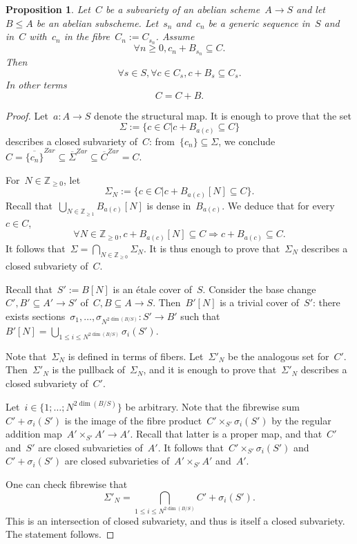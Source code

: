 \documentclass[12pt]{amsart}
\newtheorem{proposition}[theorem]{Proposition}
\newcommand{\Z}{{\mathbb Z}}
\newcommand{\ol}{\overline}
\begin{document}
\begin{proposition}\label{prop:truc} Let~$C$ be a subvariety of an abelian scheme~$A\to S$ and let~$B\leq A$ be an abelian subscheme. Let~$s_n$ and~$c_n$ be a generic sequence in~$S$ and in~$C$ with~$c_n$ in the fibre~$C_n:=C_{s_n}$. Assume 
\[
\forall n\geq 0, c_n+B_{s_n}\subseteq C.
\]
Then
\[
\forall s\in S, \forall c\in C_s, c+B_s\subseteq C_s.
\]
In other terms
\[
C=C+B.
\]
\end{proposition}
\begin{proof}
Let~$a:A\to S$ denote the structural map. It is enough to prove that the set
\[
\Sigma:=\{c\in C| c+B_{a(c)}\subseteq C\}
\]
describes a closed subvariety of~$C$: from~$\{c_n\}\subseteq \Sigma$, we conclude~$C=\ol{\{c_n\}}^{Zar}\subseteq \ol{\Sigma}^{Zar}\subseteq \ol{C}^{Zar}=C$.

For~$N\in \Z_{\geq0}$, let
\[
\Sigma_N:=\{c\in C| c+B_{a(c)}[N]\subseteq C\}.
\]
Recall that~$\bigcup_{N\in\Z_{\geq1}}B_{a(c)}[N]$ is dense in~$B_{a(c)}$. We deduce that for every~$c\in C$,
\[
\forall N\in\Z_{\geq0}, c+B_{a(c)}[N]\subseteq C\Rightarrow c+B_{a(c)}\subseteq C.
\]
It follows that~$\Sigma=\bigcap_{N\in\Z_{\geq0}} \Sigma_N$. It is thus enough to prove that~$\Sigma_N$ describes a closed subvariety of~$C$.


Recall that~$S':=B[N]$ is an étale cover of~$S$. Consider the base change~$C',B'\subseteq A'\to S'$ of~$C,B\subseteq A\to S$. Then~$B'[N]$ is a trivial cover of~$S'$: there exists sections~$\sigma_1,\ldots, \sigma_{N^{2\dim(B/S)}}:S'\to B'$ such that~$B'[N]=\bigcup_{1\leq i \leq N^{2\dim(B/S)}} \sigma_i(S')$.

Note that~$\Sigma_N$ is defined in terms of fibers. Let~$\Sigma'_N$ be the analogous set for~$C'$. Then~$\Sigma'_N$ is the pullback of~$\Sigma_N$, and it is enough to prove that~$\Sigma'_N$ describes a closed subvariety of~$C'$. 

Let~$i\in\{1;\ldots;N^{2\dim(B/S)}\}$ be arbitrary.
Note that the fibrewise sum~$C'+\sigma_i(S')$ is the image of the fibre product~$C'\times_{S'}\sigma_i(S')$ by the regular addition map~$A'\times_{S'}A'\to A'$. 
Recall that latter is a proper map, and that~$C'$ and~$S'$ are closed subvarieties of~$A'$. It follows that~$C'\times_{S'}\sigma_i(S')$ and~$C'+\sigma_i(S')$ are closed subvarieties of~$A'\times_{S'}A'$ and~$A'$.

One can check fibrewise that
\[
\Sigma'_N=\bigcap_{1\leq i \leq N^{2\dim(B/S)}}  C'+\sigma_i(S').
\]
This is an intersection of closed subvariety, and thus is itself a closed subvariety. The statement follows.\end{proof}
\end{document}
